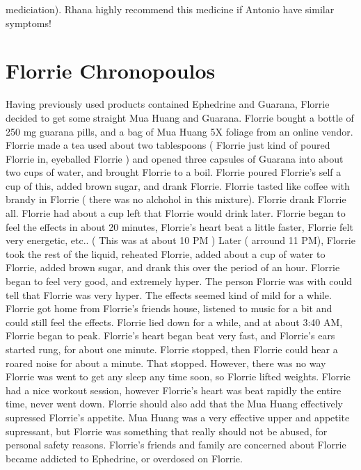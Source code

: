\documentclass[12pt]{book}
\begin{document}
mediciation). Rhana highly recommend this medicine if Antonio have similar symptoms!



\chapter{Florrie Chronopoulos}

Having previously used products contained Ephedrine and Guarana, Florrie decided to get some straight Mua Huang and Guarana. Florrie bought a bottle of 250 mg guarana pills, and a bag of Mua Huang 5X foliage from an online vendor. Florrie made a tea used about two tablespoons ( Florrie just kind of poured Florrie in, eyeballed Florrie ) and opened three capsules of Guarana into about two cups of water, and brought Florrie to a boil. Florrie poured Florrie's self a cup of this, added brown sugar, and drank Florrie. Florrie tasted like coffee with brandy in Florrie ( there was no alchohol in this mixture). Florrie drank Florrie all. Florrie had about a cup left that Florrie would drink later. Florrie began to feel the effects in about 20 minutes, Florrie's heart beat a little faster, Florrie felt very energetic, etc.. ( This was at about 10 PM ) Later ( arround 11 PM), Florrie took the rest of the liquid, reheated Florrie, added about a cup of water to Florrie, added brown sugar, and drank this over the period of an hour. Florrie began to feel very good, and extremely hyper. The person Florrie was with could tell that Florrie was very hyper. The effects seemed kind of mild for a while. Florrie got home from Florrie's friends house, listened to music for a bit and could still feel the effects. Florrie lied down for a while, and at about 3:40 AM, Florrie began to peak. Florrie's heart began beat very fast, and Florrie's ears started rung, for about one minute. Florrie stopped, then Florrie could hear a roared noise for about a minute. That stopped. However, there was no way Florrie was went to get any sleep any time soon, so Florrie lifted weights. Florrie had a nice workout session, however Florrie's heart was beat rapidly the entire time, never went down. Florrie should also add that the Mua Huang effectively supressed Florrie's appetite. Mua Huang was a very effective upper and appetite supressant, but Florrie was something that really should not be abused, for personal safety reasons. Florrie's friends and family are concerned about Florrie became addicted to Ephedrine, or overdosed on Florrie.
\end{document}
